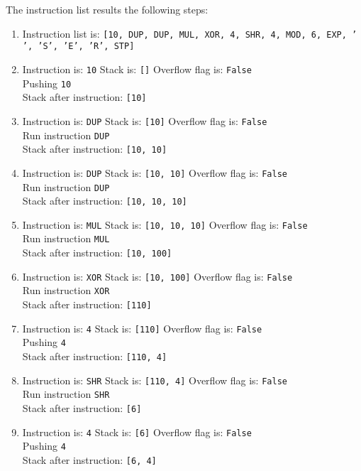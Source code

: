The instruction list results the following steps:

\begin{enumerate}
\item Instruction list is:  \texttt{[10, DUP, DUP, MUL, XOR, 4, SHR, 4, MOD, 6, EXP, ' ', 'S', 'E', 'R', STP]}
\item Instruction is: \texttt{10} Stack is: \texttt{[]} Overflow flag is: \texttt{False}\\
	Pushing \texttt{10}\\
	Stack after instruction:  \texttt{[10]}
\item Instruction is: \texttt{DUP} Stack is: \texttt{[10]} Overflow flag is: \texttt{False}\\
	Run instruction \texttt{DUP}\\
	Stack after instruction:  \texttt{[10, 10]}
\item Instruction is: \texttt{DUP} Stack is: \texttt{[10, 10]} Overflow flag is: \texttt{False}\\
	Run instruction \texttt{DUP}\\
	Stack after instruction:  \texttt{[10, 10, 10]}
\item Instruction is: \texttt{MUL} Stack is: \texttt{[10, 10, 10]} Overflow flag is: \texttt{False}\\
	Run instruction \texttt{MUL}\\
	Stack after instruction:  \texttt{[10, 100]}
\item Instruction is: \texttt{XOR} Stack is: \texttt{[10, 100]} Overflow flag is: \texttt{False}\\
	Run instruction \texttt{XOR}\\
	Stack after instruction:  \texttt{[110]}
\item Instruction is: \texttt{4} Stack is: \texttt{[110]} Overflow flag is: \texttt{False}\\
	Pushing \texttt{4}\\
	Stack after instruction:  \texttt{[110, 4]}
\item Instruction is: \texttt{SHR} Stack is: \texttt{[110, 4]} Overflow flag is: \texttt{False}\\
	Run instruction \texttt{SHR}\\
	Stack after instruction:  \texttt{[6]}
\item Instruction is: \texttt{4} Stack is: \texttt{[6]} Overflow flag is: \texttt{False}\\
	Pushing \texttt{4}\\
	Stack after instruction:  \texttt{[6, 4]}

\end{enumerate}
